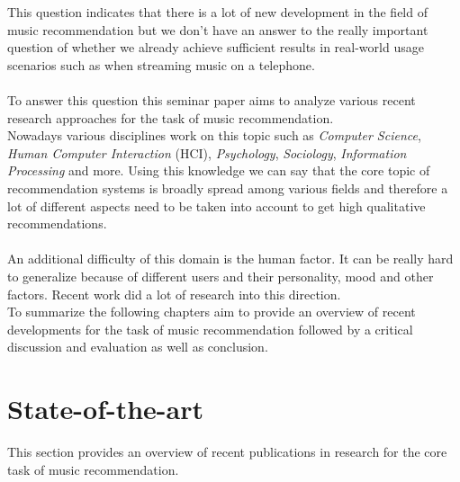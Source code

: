 \documentclass[runningheads,a4paper]{llncs}
\begin{document}
This question indicates that there is a lot of new development in the field of music recommendation but we don't have an answer to the really important question of whether we already achieve 
sufficient results in real-world usage scenarios such as when streaming music on a telephone.\\
\\
To answer this question this seminar paper aims to analyze various recent research approaches for the task of music recommendation.\\
Nowadays various disciplines work on this topic such as \textit{Computer Science}, \textit{Human Computer Interaction} (HCI), 
\textit{Psychology}, \textit{Sociology}, \textit{Information Processing} and more. 
Using this knowledge we can say that the core topic of recommendation systems is broadly spread among various fields and therefore 
a lot of different aspects need to be taken into account to get high qualitative recommendations. \\
\\
An additional difficulty of this domain is the human factor. It can be really hard to generalize because of 
different users and their personality, mood and other factors. Recent work did a lot of research into this direction.\\
To summarize the following chapters aim to provide an overview of recent developments for the task of music recommendation 
followed by a critical discussion and evaluation as well as conclusion. 
\section{State-of-the-art}
This section provides an overview of recent publications in research for the core task of music recommendation. 
\end{document}
